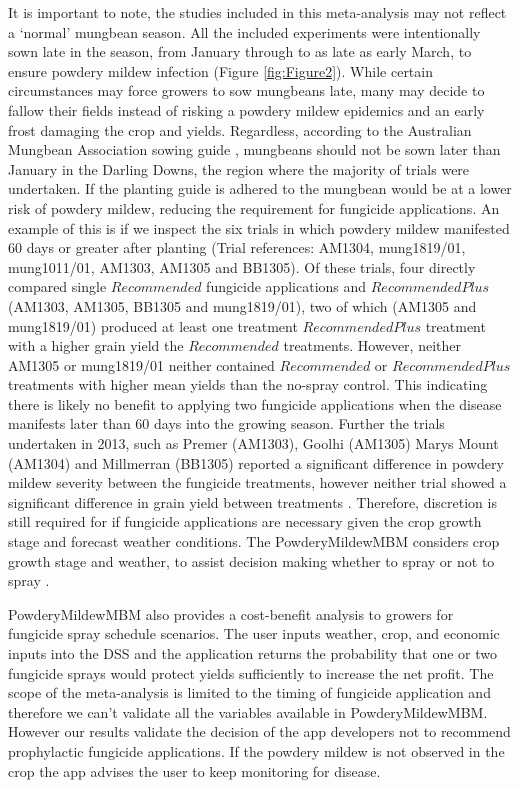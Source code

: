 \documentclass[agronomy,article,submit,moreauthors,pdftex]{mdpi}
\begin{document}
It is important to note, the studies included in this meta-analysis may not reflect a `normal' mungbean season.
All the included experiments were intentionally sown late in the season, from January through to as late as early March, to ensure powdery mildew infection (Figure \ref{fig:Figure2}).
While certain circumstances may force growers to sow mungbeans late, many may decide to fallow their fields instead of risking a powdery mildew epidemics and an early frost damaging the crop and yields.
Regardless, according to the Australian Mungbean Association sowing guide \citep{AMAplanting}, mungbeans should not be sown later than January in the Darling Downs, the region where the majority of trials were undertaken.
If the planting guide is adhered to the mungbean would be at a lower risk of powdery mildew, reducing the requirement for fungicide applications.
An example of this is if we inspect the six trials in which powdery mildew manifested 60 days or greater after planting (Trial references: AM1304, mung1819/01, mung1011/01, AM1303, AM1305 and BB1305).
Of these trials, four directly compared single \(Recommended\) fungicide applications and \(RecommendedPlus\) (AM1303, AM1305, BB1305 and mung1819/01), two of which (AM1305 and mung1819/01) produced at least one treatment \(RecommendedPlus\) treatment with a higher grain yield the \(Recommended\) treatments.
However, neither AM1305 or mung1819/01 neither contained \(Recommended\) or \(RecommendedPlus\) treatments with higher mean yields than the no-spray control.
This indicating there is likely no benefit to applying two fungicide applications when the disease manifests later than 60 days into the growing season.
Further the trials undertaken in 2013, such as Premer (AM1303), Goolhi (AM1305) Marys Mount (AM1304) and Millmerran (BB1305) reported a significant difference in powdery mildew severity between the fungicide treatments, however neither trial showed a significant difference in grain yield between treatments \citep[\citet{premer2013}, \citet{Marysmount2013}, \citet{goolhi2013}]{Millmerran2013}.
Therefore, discretion is still required for if fungicide applications are necessary given the crop growth stage and forecast weather conditions.
The PowderyMildewMBM considers crop growth stage and weather, to assist decision making whether to spray or not to spray \citep{Diggle}.

PowderyMildewMBM also provides a cost-benefit analysis to growers for fungicide spray schedule scenarios.
The user inputs weather, crop, and economic inputs into the DSS and the application returns the probability that one or two fungicide sprays would protect yields sufficiently to increase the net profit.
The scope of the meta-analysis is limited to the timing of fungicide application and therefore we can't validate all the variables available in PowderyMildewMBM.
However our results validate the decision of the app developers not to recommend prophylactic fungicide applications.
If the powdery mildew is not observed in the crop the app advises the user to keep monitoring for disease.\\
\end{document}
